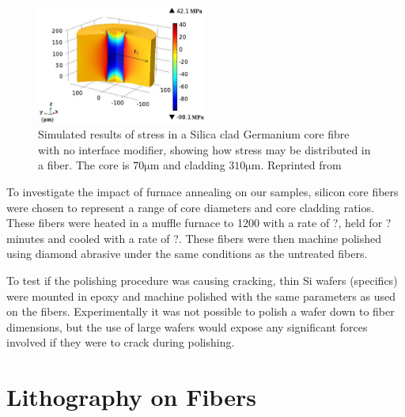 \begin{figure}[h]
    \centering
    \includegraphics[width=0.5\textwidth]{fig/polishing/stress_simulation.png}
    \caption{Simulated results of stress in a Silica clad Germanium core fibre with no interface modifier, showing how stress may be distributed in a fiber. The core is $70\si{\micro\meter}$ and cladding $310\si{\micro\meter}$. Reprinted from \cite{Zhao2017EffectFiber}}
    \label{fig:my_label}
\end{figure}

To investigate the impact of furnace annealing on our samples, silicon core fibers were chosen to represent a range of core diameters and core cladding ratios. These fibers were heated in a muffle furnace to 1200 with a rate of ?, held for ? minutes and cooled with a  rate of ?. These fibers were then machine polished using diamond abrasive under the same conditions as the untreated fibers. 

To test if the polishing procedure was causing cracking, thin Si wafers (specifics) were mounted in epoxy and machine polished with the same parameters as used on the fibers. Experimentally it was not possible to polish a wafer down to fiber dimensions, but the use of large wafers would expose any significant forces involved if they were to crack during polishing.




\section{Lithography on Fibers}
